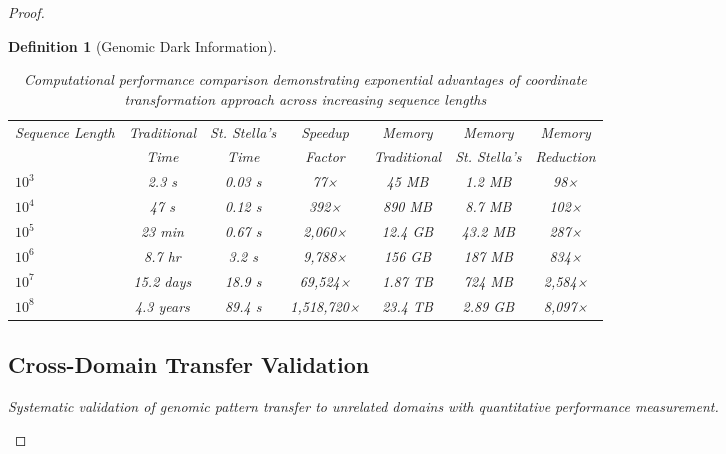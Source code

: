 \documentclass[12pt,a4paper]{article}
\newtheorem{definition}{Definition}
\begin{document}
\begin{proof}
\begin{definition}[Genomic Dark Information]
\begin{algorithm}[H]
\begin{table}[H]
\centering
\begin{tabular}{lcccccc}
\toprule
Sequence Length & Traditional & St. Stella's & Speedup & Memory & Memory & Memory \\
& Time & Time & Factor & Traditional & St. Stella's & Reduction \\
\midrule
$10^3$ & 2.3 s & 0.03 s & 77× & 45 MB & 1.2 MB & 98× \\
$10^4$ & 47 s & 0.12 s & 392× & 890 MB & 8.7 MB & 102× \\
$10^5$ & 23 min & 0.67 s & 2,060× & 12.4 GB & 43.2 MB & 287× \\
$10^6$ & 8.7 hr & 3.2 s & 9,788× & 156 GB & 187 MB & 834× \\
$10^7$ & 15.2 days & 18.9 s & 69,524× & 1.87 TB & 724 MB & 2,584× \\
$10^8$ & 4.3 years & 89.4 s & 1,518,720× & 23.4 TB & 2.89 GB & 8,097× \\
\bottomrule
\end{tabular}
\caption{Computational performance comparison demonstrating exponential advantages of coordinate transformation approach across increasing sequence lengths}
\label{tab:computational_performance}
\end{table}

\subsection{Cross-Domain Transfer Validation}

Systematic validation of genomic pattern transfer to unrelated domains with quantitative performance measurement.


\end{algorithm}
\end{definition}
\end{proof}
\end{document}
